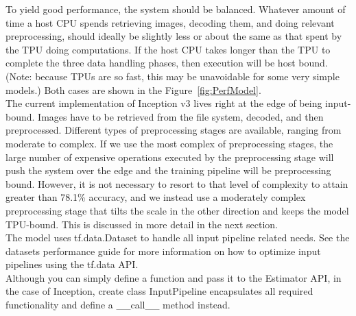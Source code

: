 \documentclass[14pt]{report}
\begin{document}
				To yield good performance, the system should be balanced. Whatever amount of time a host CPU spends retrieving images, decoding them, and doing relevant preprocessing, should ideally be slightly less or about the same as that spent by the TPU doing computations. If the host CPU takes longer than the TPU to complete the three data handling phases, then execution will be host bound. (Note: because TPUs are so fast, this may be unavoidable for some very simple models.) Both cases are shown in the Figure~\ref{fig:PerfModel}.\\
		
				The current implementation of Inception v3 lives right at the edge of being input-bound. Images have to be retrieved from the file system, decoded, and then preprocessed. Different types of preprocessing stages are available, ranging from moderate to complex. If we use the most complex of preprocessing stages, the large number of expensive operations executed by the preprocessing stage will push the system over the edge and the training pipeline will be preprocessing bound. However, it is not necessary to resort to that level of complexity to attain greater than 78.1\% accuracy, and we instead use a moderately complex preprocessing stage that tilts the scale in the other direction and keeps the model TPU-bound. This is discussed in more detail in the next section.\\

				The model uses tf.data.Dataset to handle all input pipeline related needs. See the datasets performance guide for more information on how to optimize input pipelines using the tf.data API.\\

				Although you can simply define a function and pass it to the Estimator API, in the case of Inception, create class InputPipeline encapsulates all required functionality and define a \_\_call\_\_ method instead.\\
\end{document}
